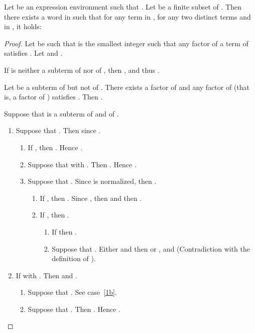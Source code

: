 \documentclass[a4paper]{llncs}
\begin{document}
  \begin{lemma}\label{lem exist mot separ}
    Let  be an expression environment such that . Let  be a finite subset of . Then there exists a word  in  such that for any term  in , for any two distinct terms  and  in , it holds:
        
  \end{lemma}
  \begin{proof} 
  Let  be such that  is the smallest integer such that any factor  of a term of  satisfies .
  Let  and .     
  
  If  is neither a subterm of  nor of , then ,  and thus .
    
  Let  be a subterm of  but not of . There exists a factor  of  and any factor  of  (that is, a factor of ) satisfies . Then .
    
  Suppose that  is a subterm of  and of . 
  
  \begin{enumerate}
    \item Suppose that . Then  since .
    \begin{enumerate}
    \item If , then . Hence .
    
    \item\label{1b} Suppose that  with . Then . Hence .
    
    \item\label{1c} Suppose that . Since  is normalized, then .
    \begin{enumerate}
    \item If , then . Since , then  and then .
    
    \item If , then .
    \begin{enumerate}
    \item If  then .
    
    \item Suppose that .  Either  and then  or , and   (Contradiction with the definition of ).
    \end{enumerate}
    \end{enumerate}
    \end{enumerate}
    
    \item  If  with . Then  and .
    \begin{enumerate}
    \item  Suppose that . See case~\ref{1b}.
    
    \item Suppose that . Then . Hence .
    

\end{enumerate}
\end{enumerate}
\end{proof}
\end{document}
